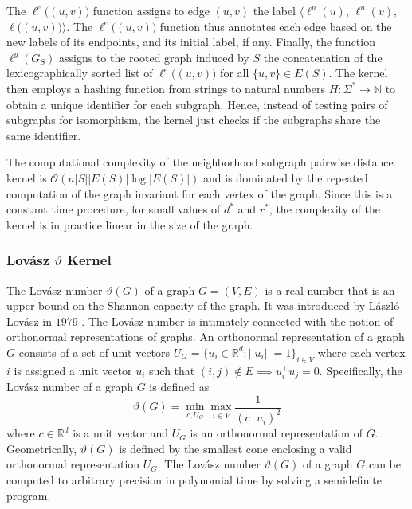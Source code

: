 \documentclass[twoside,11pt]{article}
\begin{document}
The $\ell^e \big( (u,v) \big)$ function assigns to edge $(u,v)$ the label $\langle \ell^n(u)$, $\ell^n(v)$, $\ell \big( (u,v) \big) \rangle$.
The $\ell^e \big( (u,v) \big)$ function thus annotates each edge based on the new labels of its endpoints, and its initial label, if any.
Finally, the function $\ell^g(G_S)$ assigns to the rooted graph induced by $S$ the concatenation of the lexicographically sorted list of $\ell^e \big( (u,v) \big)$ for all $\{u,v\} \in E(S)$.
The kernel then employs a hashing function from strings to natural numbers $H : \Sigma^* \rightarrow \mathbb{N}$ to obtain a unique identifier for each subgraph.
Hence, instead of testing pairs of subgraphs for isomorphism, the kernel just checks if the subgraphs share the same identifier.

The computational complexity of the neighborhood subgraph pairwise distance kernel is $\mathcal{O}(n |S| |E(S)| \log |E(S)|)$ and is dominated by the repeated computation of the graph invariant for each vertex of the graph.
Since this is a constant time procedure, for small values of $d^*$ and $r^*$, the complexity of the kernel is in practice linear in the size of the graph.

\subsubsection{Lov\'asz $\vartheta$ Kernel}
The Lov\'asz number $\vartheta(G)$ of a graph $G=(V,E)$ is a real number that is an upper bound on the Shannon capacity of the graph.
It was introduced by L\'aszl\'o Lov\'asz in $1979$ .
The Lov\'asz number is intimately connected with the notion of orthonormal representations of graphs.
An orthonormal representation of a graph $G$ consists of a set of unit vectors $U_G = \{ u_i \in \mathbb{R}^d : || u_i || = 1 \}_{i \in V}$ where each vertex $i$ is assigned a unit vector $u_i$ such that $(i,j) \not \in E \implies u_i^\top u_j = 0$.
Specifically, the Lov\'asz number of a graph $G$ is defined as
\begin{equation}
    \vartheta(G) = \min_{c, U_G} \max_{i \in V} \frac{1}{(c^\top u_i)^2}
\end{equation}
where $c \in \mathbb{R}^d$ is a unit vector and $U_G$ is an orthonormal representation of $G$. 
Geometrically, $\vartheta(G)$ is defined by the smallest cone enclosing a valid orthonormal representation $U_G$.
The Lov\'asz number $\vartheta(G)$ of a graph $G$ can be computed to arbitrary precision in polynomial time by solving a semidefinite program.
\end{document}
